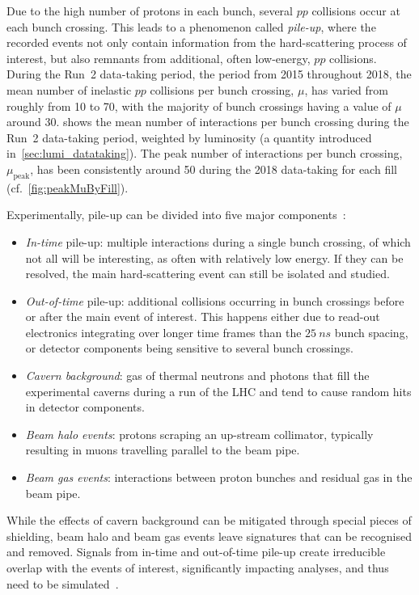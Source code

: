 Due to the high number of protons in each bunch, several $pp$ collisions occur at each bunch crossing. This leads to a phenomenon called \textit{pile-up}, where the recorded events not only contain information from the hard-scattering process of interest, but also remnants from additional, often low-energy, $pp$ collisions. During the Run~2 data-taking period, \ie the period from 2015 throughout 2018, the mean number of inelastic $pp$ collisions per bunch crossing, $\mu$, has varied from roughly from 10 to 70, with the majority of bunch crossings having a value of $\mu$ around 30.  shows the mean number of interactions per bunch crossing during the Run~2 data-taking period, weighted by luminosity (a quantity introduced in~\cref{sec:lumi_datataking}). The peak number of interactions per bunch crossing, $\mu_\mathrm{peak}$, has been consistently around 50 during the 2018 data-taking for each fill (cf.~\cref{fig:peakMuByFill}).

Experimentally, pile-up can be divided into five major components~\cite{Marshall:2014mza}:
\begin{itemize}
	\item \textit{In-time} pile-up: multiple interactions during a single bunch crossing, of which not all will be interesting, as often with relatively low energy. If they can be resolved, the main hard-scattering event can still be isolated and studied.
	\item \textit{Out-of-time} pile-up: additional collisions occurring in bunch crossings before or after the main event of interest. This happens either due to read-out electronics integrating over longer time frames than the $\SI{25}{ns}$ bunch spacing, or detector components being sensitive to several bunch crossings.
	\item \textit{Cavern background}: gas of thermal neutrons and photons that fill the experimental caverns during a run of the LHC and tend to cause random hits in detector components.
	\item \textit{Beam halo events}: protons scraping an up-stream collimator, typically resulting in muons travelling parallel to the beam pipe.
	\item \textit{Beam gas events}: interactions between proton bunches and residual gas in the beam pipe.
\end{itemize}
While the effects of cavern background can be mitigated through special pieces of shielding, beam halo and beam gas events leave signatures that can be recognised and removed. Signals from in-time and out-of-time pile-up create irreducible overlap with the events of interest, significantly impacting analyses, and thus need to be simulated~\cite{Marshall:2014mza}.

